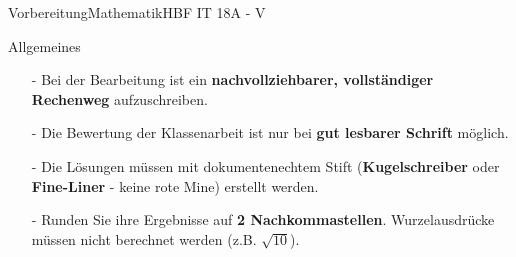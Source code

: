 \documentclass[oneside,openany,headings=optiontotoc,11pt,numbers=noenddot]{scrreprt}
\begin{document}
	\begin{test}{Vorbereitung}{Mathematik}{HBF IT 18A - V}
		\begin{framed}
			\noindent
			\scriptsize{Allgemeines
			\begin{itemize}[noitemsep,topsep=0pt]
				\item[-] Bei der Bearbeitung ist ein \textbf{nachvollziehbarer, vollständiger Rechenweg} aufzuschreiben.
				\item[-] Die Bewertung der Klassenarbeit ist nur bei \textbf{gut lesbarer Schrift} möglich.
				\item[-] Die Lösungen müssen mit dokumentenechtem Stift (\textbf{Kugelschreiber} oder \textbf{Fine-Liner} - keine rote Mine) erstellt werden.
				\item[-] Runden Sie ihre Ergebnisse auf \textbf{2 Nachkommastellen}. Wurzelausdrücke müssen nicht berechnet werden (z.B. \(\sqrt{10}\)).\\
				

\end{itemize}}
\end{framed}
\end{test}
\end{document}
